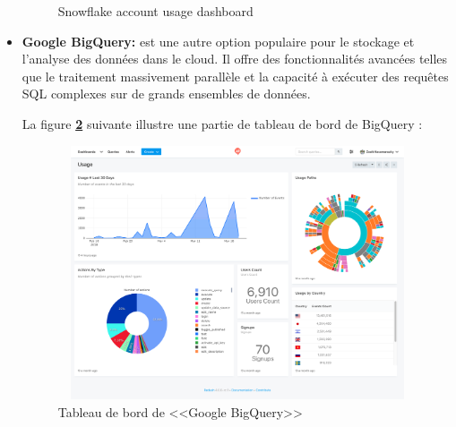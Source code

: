 \begin{itemize}
\begin{figure}[H]
            \caption{Snowflake account usage dashboard}
            \label{fig:info}
            \end{figure}
    \item\textbf{Google BigQuery:} est une autre option populaire pour le stockage et l'analyse des données dans le cloud. 
    Il offre des fonctionnalités avancées telles que le traitement massivement parallèle et la capacité à exécuter des requêtes SQL complexes sur de grands ensembles de données. 
    \par La figure \textbf{\ref{fig:BQ}} suivante illustre une partie de tableau de bord de BigQuery :
            \begin{figure}[H]
            \centering
            \includegraphics[width =13cm, height=7.5cm]{img/captures/bigquery}
            \caption{Tableau de bord de <<Google BigQuery>>}
            \label{fig:BQ}
            \end{figure}


\end{itemize}

